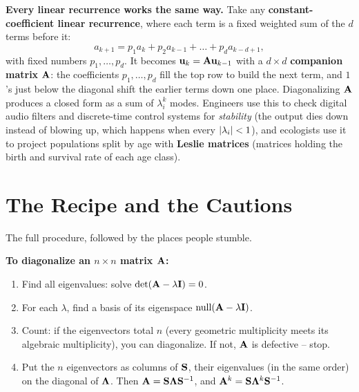 \begin{applicationbox}
\textbf{Every linear recurrence works the same way.} Take any
\textbf{constant-coefficient linear recurrence}, where each term is a fixed
weighted sum of the $d$ terms before it:
\[
  a_{k+1} = p_1 a_k + p_2 a_{k-1} + \dots + p_d a_{k-d+1},
\]
with fixed numbers $p_1,\dots,p_d$. It becomes
$\mathbf{u}_k = \mathbf{A}\mathbf{u}_{k-1}$ with a $d\times d$ \textbf{companion matrix}
$\mathbf{A}$: the coefficients $p_1,\dots,p_d$ fill the top row to build the next
term, and $1$'s just below the diagonal shift the earlier terms down one place.
Diagonalizing $\mathbf{A}$ produces a closed form as a sum of $\lambda_i^k$ modes.
Engineers use this to check digital audio filters and discrete-time control
systems for \emph{stability} (the output dies down instead of blowing up, which
happens when every $\lvert\lambda_i\rvert<1$), and ecologists use it to project
populations split by age with \textbf{Leslie matrices} (matrices holding the
birth and survival rate of each age class).
\end{applicationbox}

\section{The Recipe and the Cautions}
\label{ch24:recipe}

The full procedure, followed by the places people stumble.

\begin{focusbox}
\textbf{To diagonalize an $n\times n$ matrix $\mathbf{A}$:}
\begin{enumerate}
  \item Find all eigenvalues: solve $\det(\mathbf{A}-\lambda\mathbf{I}) = 0$.
  \item For each $\lambda$, find a basis of its eigenspace
        $\operatorname{null}(\mathbf{A}-\lambda\mathbf{I})$.
  \item Count: if the eigenvectors total $n$ (every geometric multiplicity meets
        its algebraic multiplicity), you can diagonalize. If not, $\mathbf{A}$ is
        defective -- stop.
  \item Put the $n$ eigenvectors as columns of $\mathbf{S}$, their eigenvalues
        (in the same order) on the diagonal of $\mathbf{\Lambda}$. Then $\mathbf{A} =
        \mathbf{S}\mathbf{\Lambda}\mathbf{S}^{-1}$, and $\mathbf{A}^k =
        \mathbf{S}\mathbf{\Lambda}^k\mathbf{S}^{-1}$.
\end{enumerate}
\end{focusbox}

